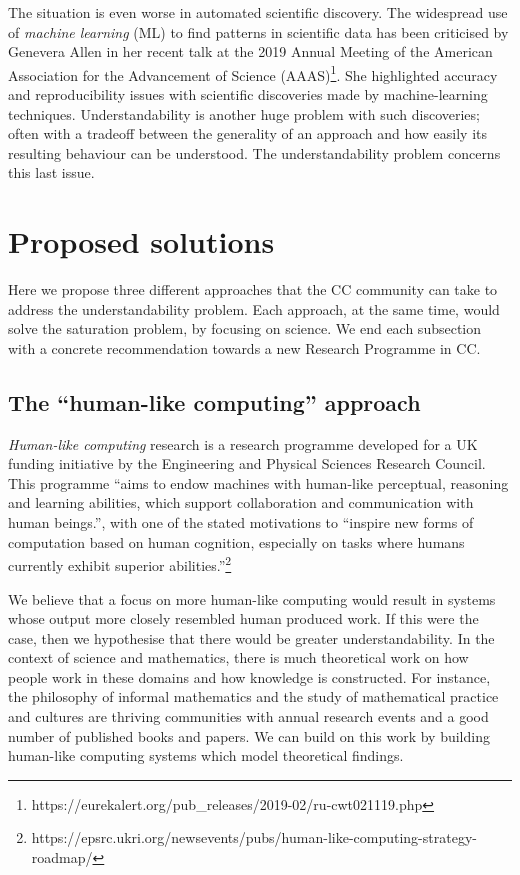 \documentclass[letterpaper]{article}
\begin{document}
The situation is even worse in automated scientific discovery. The
widespread use of \emph{machine learning} (ML) to find patterns in
scientific data has been criticised by Genevera Allen in her recent
talk at the 2019 Annual Meeting of the American Association for the
Advancement of Science
(AAAS)\footnote{https://eurekalert.org/pub\_releases/2019-02/ru-cwt021119.php}. She
highlighted accuracy and reproducibility issues with scientific
discoveries made by machine-learning techniques. Understandability is
another huge problem with such discoveries; often with a tradeoff
between the generality of an approach and how easily its resulting
behaviour can be understood. The understandability problem concerns
this last issue.


\section{Proposed solutions}
Here we propose three different approaches that the CC community can
take to address the understandability problem.  Each approach, at the
same time, would solve the saturation problem, by focusing on
science. We end each subsection with a concrete recommendation towards
a new Research Programme in CC.

\subsection{The ``human-like computing'' approach}

{\em Human-like computing} research is a research programme developed
for a UK funding initiative by the Engineering and Physical Sciences
Research Council. This programme ``aims to endow machines with
human-like perceptual, reasoning and learning abilities, which support
collaboration and communication with human beings.'', with one of the
stated motivations to ``inspire new forms of computation based on
human cognition, especially on tasks where humans currently exhibit
superior
abilities.''\footnote{https://epsrc.ukri.org/newsevents/pubs/human-like-computing-strategy-roadmap/}

We believe that a focus on more human-like computing would result in
systems whose output more closely resembled human produced work. If
this were the case, then we hypothesise that there would be greater
understandability.  In the context of science and mathematics, there
is much theoretical work on how people work in these domains and how
knowledge is constructed. For instance, the philosophy of informal
mathematics and the study of mathematical practice and cultures are
thriving communities with annual research events and a good number of
published books and papers. We can build on this work by building
human-like computing systems which model theoretical findings.
\end{document}
